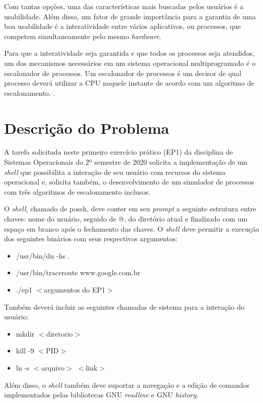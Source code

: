 \documentclass[12pt]{article}
\begin{document}
Com tantas opções, uma das características mais buscadas pelos usuários é a usabilidade. Além disso, um fator de grande importância para a garantia de uma boa usabilidade é a interatividade entre vários aplicativos, ou processos, que competem simultaneamente pelo mesmo \textit{hardware}.

Para que a interatividade seja garantida e que todos os processos seja atendidos, um dos mecanismos necessários em um sistema operacional multiprogramado é o escalonador de processos. Um escalonador de processos é um decisor de qual processo deverá utilizar a CPU naquele instante de acordo com um algoritmo de escalonamento. \cite{tanenbaum:16}.

\section{Descrição do Problema} \label{sec:firstpage}

A tarefa solicitada neste primeiro exercício prático (EP1) da disciplina de Sistemas Operacionais do 2º semestre de 2020 solicita a implementação de um \textit{shell} que possibilita a interação de seu usuário com recursos do sistema operacional e, solicita também, o desenvolvimento de um simulador de processos com três algoritmos de escalonamento inclusos.

O \textit{shell}, chamado de possh, deve conter em seu \textit{prompt} a seguinte estrutura entre chaves: nome do usuário, seguido de @, do diretório atual e finalizado com um espaço em branco após o fechamento das chaves. O \textit{shell} deve permitir a execução dos seguintes binários com seus respectivos argumentos:
\begin{itemize}
	\item /usr/bin/du -hs .
	\item /usr/bin/traceroute www.google.com.br
	\item ./ep1 $<$argumentos do EP1$>$
\end{itemize}

Também deverá incluir as seguintes chamadas de sistema para a interação do usuário:
\begin{itemize}
	\item mkdir $<$diretorio$>$
	\item kill -9 $<$PID$>$
	\item ln -s $<$arquivo$>$ $<$link$>$
\end{itemize}

Além disso, o \textit{shell} também deve suportar a navegação e a edição de comandos implementados pelas bibliotecas GNU \textit{readline} e GNU \textit{history}.
\end{document}
